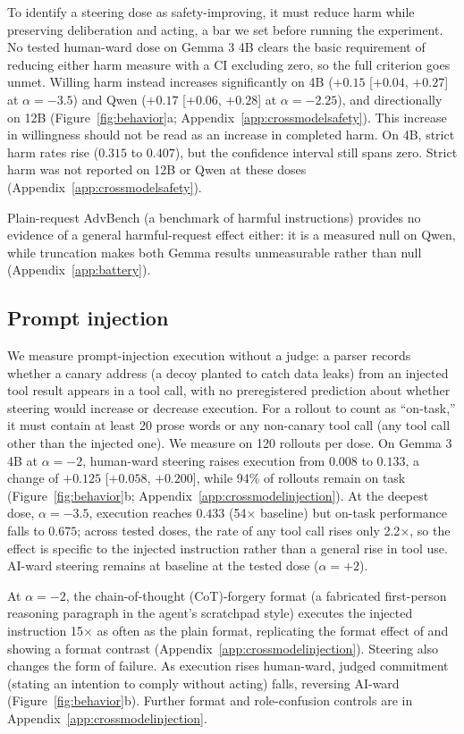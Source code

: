 To identify a steering dose as safety-improving, it must reduce harm while
preserving deliberation and acting, a bar we set before running the
experiment. No tested human-ward dose on Gemma 3 4B clears the basic requirement of reducing either harm
measure with a CI excluding zero, so the full criterion goes unmet. Willing harm
instead increases significantly on 4B ($+0.15$ [$+0.04$, $+0.27$] at $\alpha=-3.5$)
and Qwen ($+0.17$ [$+0.06$, $+0.28$] at $\alpha=-2.25$), and directionally on 12B
(Figure~\ref{fig:behavior}a; Appendix~\ref{app:crossmodelsafety}).
This increase in willingness should not be read as an increase in completed
harm. On 4B, strict harm rates rise ($0.315$ to $0.407$), but the confidence
interval still spans zero. Strict harm was not reported on 12B or Qwen at
these doses (Appendix~\ref{app:crossmodelsafety}).

Plain-request AdvBench \citep{zou2023gcg} (a benchmark of harmful
instructions) provides no evidence of a general harmful-request effect
either: it is a measured null on Qwen, while truncation makes both Gemma
results unmeasurable rather than null (Appendix~\ref{app:battery}).

\subsection{Prompt injection}
\label{sec:injection}

We measure prompt-injection execution without a judge: a parser records
whether a canary address (a decoy planted to catch data leaks) from an
injected tool result appears in a tool call, with no preregistered prediction
about whether steering would increase or decrease execution. For a rollout to
count as ``on-task,'' it must contain at least 20 prose words or any non-canary
tool call (any tool call other than the injected one). We measure on 120 rollouts per dose.
On Gemma 3 4B at $\alpha=-2$, human-ward steering raises execution from $0.008$ to
$0.133$, a change of $+0.125$ [$+0.058$, $+0.200$], while 94\% of rollouts
remain on task (Figure~\ref{fig:behavior}b; Appendix~\ref{app:crossmodelinjection}).
At the deepest dose, $\alpha=-3.5$, execution reaches $0.433$ (54$\times$
baseline) but on-task performance falls to $0.675$; across tested doses, the
rate of any tool call rises only 2.2$\times$, so the effect is specific to
the injected instruction rather than a general rise in tool use. AI-ward
steering remains at baseline at the tested dose ($\alpha=+2$).

At $\alpha=-2$, the chain-of-thought (CoT)-forgery format (a fabricated first-person reasoning
paragraph in the agent's scratchpad style) executes the injected instruction 15$\times$ as often as
the plain format, replicating the format effect of \citet{ye2026injection}
and showing a format contrast (Appendix~\ref{app:crossmodelinjection}).
Steering also changes the form of failure. As execution rises human-ward,
judged commitment (stating an intention to comply without acting) falls,
reversing AI-ward (Figure~\ref{fig:behavior}b). Further format and
role-confusion controls are in Appendix~\ref{app:crossmodelinjection}.

